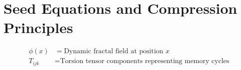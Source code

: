 
\section{Seed Equations and Compression Principles}

\begin{align*}
\phi(x) &= \text{Dynamic fractal field at position } x \\
T_{ijk} &= \text{Torsion tensor components representing memory cycles} \\
\end{align*}